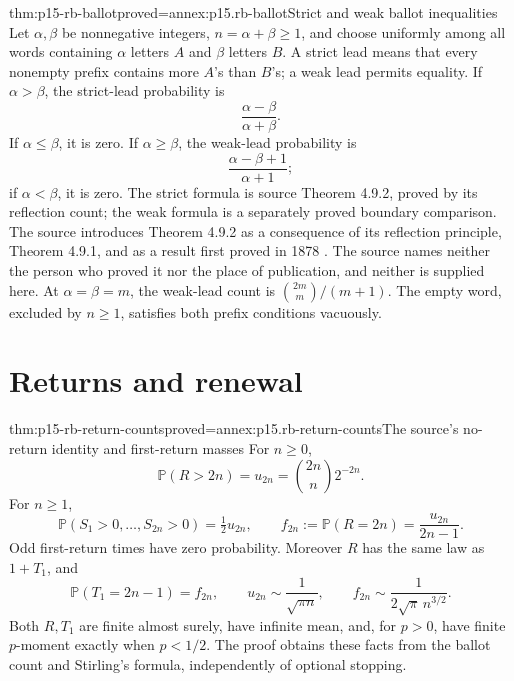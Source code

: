 \begin{hbtheorem}{thm:p15-rb-ballot}{proved=annex:p15.rb-ballot}{Strict and weak ballot inequalities}
Let \(\alpha,\beta\) be nonnegative integers,
\(n=\alpha+\beta\geq1\), and choose uniformly among all
words containing \(\alpha\) letters \(A\) and \(\beta\) letters \(B\).
A strict lead means that every nonempty prefix contains more
\(A\)'s than \(B\)'s; a weak lead permits equality.
If \(\alpha>\beta\), the strict-lead probability is
\[
                       \frac{\alpha-\beta}{\alpha+\beta}.
 \]
If \(\alpha\leq\beta\), it is zero.
If \(\alpha\geq\beta\), the weak-lead probability is
\[
                       \frac{\alpha-\beta+1}{\alpha+1};
 \]
if \(\alpha<\beta\), it is zero.
The strict formula is source Theorem 4.9.2, proved by its
reflection count; the weak formula is a separately proved boundary
comparison. The source introduces Theorem 4.9.2 as a consequence of
its reflection principle, Theorem 4.9.1, and as a result first proved
in 1878 \cite[p.~263]{DurrettPTEAuthor2019}. The source names neither
the person who proved it nor the place of publication, and neither is
supplied here. At \(\alpha=\beta=m\), the weak-lead count is
\(\binom{2m}{m}/(m+1)\). The empty word, excluded by \(n\geq1\),
satisfies both prefix conditions vacuously.
\end{hbtheorem}

\section{Returns and renewal}
\label{sec:p15-rb-returns}

\begin{hbtheorem}{thm:p15-rb-return-counts}{proved=annex:p15.rb-return-counts}{The source's no-return identity and first-return masses}
For \(n\geq0\),
\[
 \mathbb P(R>2n)=u_{2n}
                  =\binom{2n}{n}2^{-2n}.
 \]
For \(n\geq1\),
\[
 \mathbb P(S_1>0,\ldots,S_{2n}>0)=\tfrac12u_{2n},
 \qquad
 f_{2n}:=\mathbb P(R=2n)=\frac{u_{2n}}{2n-1}.
 \]
Odd first-return times have zero probability.
Moreover \(R\) has the same law as \(1+T_1\), and
\[
 \mathbb P(T_1=2n-1)=f_{2n},\qquad
 u_{2n}\sim\frac1{\sqrt{\pi n}},\qquad
 f_{2n}\sim\frac1{2\sqrt\pi\,n^{3/2}}.
 \]
Both \(R,T_1\) are finite almost surely, have infinite mean,
and, for \(p>0\), have finite \(p\)-moment exactly when \(p<1/2\).
The proof obtains these facts from the ballot count and
Stirling's formula, independently of optional stopping.
\end{hbtheorem}

